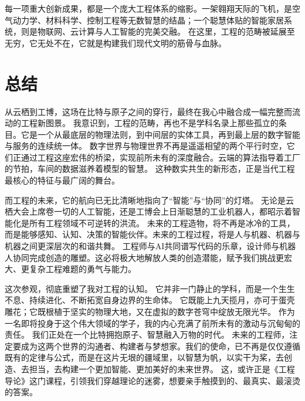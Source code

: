 \documentclass[UTF8,a4paper]{ctexart}
\theoremstyle{definition}
\theoremstyle{remark}
\begin{document}
每一项重大创新成果，都是一个庞大工程体系的缩影。一架翱翔天际的飞机，是空气动力学、材料科学、控制工程等无数智慧的结晶；一个聪慧体贴的智能家居系统，则是物联网、云计算与人工智能的完美交融。
在这里，工程的范畴被延展至无穷，它无处不在，它就是构建我们现代文明的筋骨与血脉。

\section{总结}
从云栖到工博，这场在比特与原子之间的穿行，最终在我心中融合成一幅完整而流动的工程新图景。
我意识到，工程的范畴，再也不是学科名录上那些孤立的条目。它是一个从最底层的物理法则，到中间层的实体工具，再到最上层的数字智能与服务的连续统一体。
数字世界与物理世界不再是遥遥相望的两个平行时空，它们正通过工程这座宏伟的桥梁，实现前所未有的深度融合。云端的算法指导着工厂的节拍，车间的数据滋养着模型的智慧。
这种数实共生的新形态，正是当代工程最核心的特征与最广阔的舞台。

而工程的未来，它的航向已无比清晰地指向了“智能”与“协同”的灯塔。
无论是云栖大会上席卷一切的人工智能，还是工博会上日渐聪慧的工业机器人，都昭示着智能化是所有工程领域不可逆转的洪流。
未来的工程造物，将不再是冰冷的工具，而是能够感知、认知、决策的智能伙伴。未来的工程过程，将是人与机器、机器与机器之间更深层次的和谐共舞。
工程师与AI共同谱写代码的乐章，设计师与机器人协同完成创造的雕塑。这必将极大地解放人类的创造潜能，赋予我们挑战更宏大、更复杂工程难题的勇气与能力。

这次参观，彻底重塑了我对工程的认知。
它并非一门静止的学科，而是一个生生不息、持续进化、不断拓宽自身边界的生命体。
它既能上九天揽月，亦可于蛋壳雕花；它既根植于坚实的物理大地，又在虚拟的数字苍穹中绽放无限光华。
作为一名即将投身于这个伟大领域的学子，我的内心充满了前所未有的激动与沉甸甸的责任。
我们正处在一个比特拥抱原子、智慧融入万物的时代。
未来的工程师，注定要成为这两个世界的沟通者、构建者与梦想家。我们的使命，已不再是仅仅遵循既有的定律与公式，而是在这片无垠的疆域里，以智慧为帆，以实干为桨，去创造、去担当，去构建一个更加智能、更加美好的未来世界。
这，或许正是《工程导论》这门课程，引领我们穿越理论的迷雾，想要亲手触摸到的、最真实、最滚烫的答案。
\end{document}

